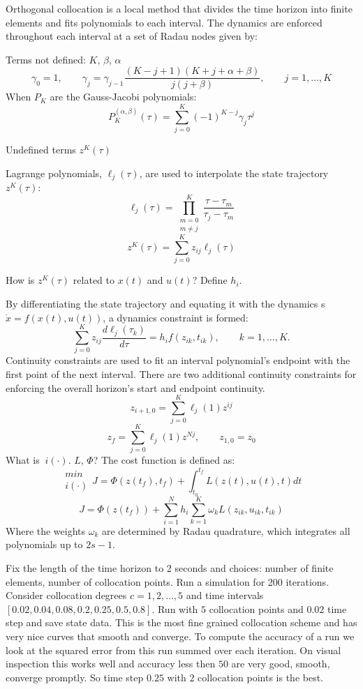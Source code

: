 \documentclass[]{article}
\begin{document}
Orthogonal collocation is a local method that divides the time horizon into finite elements and fits polynomials to each interval. The dynamics are enforced throughout each interval at a set of Radau nodes given by:

Terms not defined: $K$, $\beta$, $\alpha$
\[
\gamma_0=1,  \qquad \gamma_j = \gamma_{j-1} \frac{(K-j+1)(K+j+\alpha+\beta)}{j(j+\beta)}, \qquad j = 1,\ldots,K
\]
When $P_K$ are the Gauss-Jacobi polynomials:
\[
P_K^{(\alpha, \beta)}(\tau) = \sum_{j=0}^{K}(-1)^{K-j}\gamma_j\tau^j
\]

Undefined terms $z^K(\tau)$

Lagrange polynomials, $\ell_j(\tau)$, are used to interpolate the state trajectory $z^K(\tau)$:
\[
\ell_j(\tau)=\prod_{\substack{m=0 \\ m\neq j}}^{K}\frac{\tau-\tau_m}{\tau_j-\tau_m}
\]        
\[
z^K(\tau)=\sum_{j=0}^{K}z_{ij}\ell_j(\tau)
\]

How is $z^K(\tau)$ related to $x(t)$ and $u(t)$? Define $h_i$.

By differentiating the state trajectory and equating it with the dynamics     s$\dot{x} =  f(x(t),u(t))$, a dynamics constraint is formed:
\[
\sum_{j=0}^K z_{ij}\frac{d\ell_j(\tau_k)}{d\tau}=h_if(z_{ik},t_{ik}), 
\qquad k=1,\dots,K.
\]
Continuity constraints are used to fit an interval polynomial's endpoint with the first point of the next interval. There are two additional continuity constraints for enforcing the overall horizon's start and endpoint continuity.
\[
z_{i+1,0}=\sum_{j=0}^{K}\ell_j(1)z^{ij}
\]
\[
z_f=\sum_{j=0}^{K}\ell_j(1)z^{Nj}, \qquad z_{1,0} = z_0
\]
What is $\ i(\cdot)$. $L$, $\Phi$?
The cost function is defined as:
\[
\substack{min \\ i(\cdot)}J=\Phi(z(t_f),t_f) + \int_{t_0}^{t_f}L(z(t),u(t),t)dt
\]
\[
J=\Phi(z(t_f)) + \sum_{i=1}^{N}h_i\sum_{k=1}^{K}\omega_kL(z_{ik},u_{ik},t_{ik})
\]
Where the weights $\omega_k$ are determined by Radau quadrature, which integrates all polynomials up to $2s-1$. 


Fix the length of the time horizon to 2 seconds and choices: number of finite elements, number of collocation points. Run a simulation for 200 iterations. Consider collocation degrees $c = 1, 2, \ldots, 5$ and time intervals $[0.02, 0.04, 0.08, 0.2, 0.25, 0.5, 0.8]$. Run with $5$ collocation points and $0.02$ time step and save state data. This is the most fine grained collocation scheme and has very nice curves that smooth and converge.  To compute the accuracy of a run we look at the squared error from this run summed over each iteration. On visual inspection this works well and accuracy less then $50$ are very good, smooth, converge promptly. So time step $0.25$ with $2$ collocation points is the best. 
\end{document}
